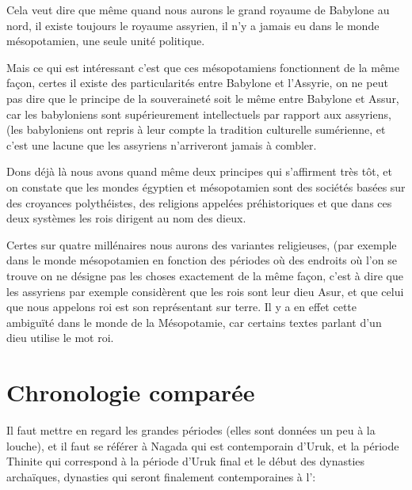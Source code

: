 \documentclass[a4paper,10pt]{article}
\begin{document}
Cela veut dire que même quand nous aurons le grand royaume de Babylone 
au nord, il existe toujours le royaume assyrien, il n'y a jamais eu 
dans le monde mésopotamien, une seule unité politique.

Mais ce qui est intéressant c'est que ces mésopotamiens fonctionnent 
de la même façon, certes il existe des particularités entre Babylone 
et l'Assyrie, on ne peut pas dire que le principe de la souveraineté 
soit le même entre Babylone et Assur, car les babyloniens sont 
supérieurement intellectuels par rapport aux assyriens, (les 
babyloniens ont repris à leur compte la tradition culturelle 
sumérienne, et c'est une lacune que les assyriens n'arriveront jamais 
à combler.

Dons déjà là nous avons quand même deux principes qui s'affirment très 
tôt, et on constate que les mondes égyptien et mésopotamien sont des 
sociétés basées sur des croyances polythéistes, des religions appelées 
préhistoriques et que dans ces deux systèmes les rois dirigent au nom 
des dieux.

Certes sur quatre millénaires nous aurons des variantes religieuses, 
(par exemple dans le monde mésopotamien en fonction des périodes où des 
endroits où l'on se trouve on ne désigne pas les choses exactement de 
la même façon, c'est à dire que les assyriens par exemple considèrent 
que les rois sont leur dieu Asur, et que celui que nous appelons roi 
est son représentant sur terre. 
Il y a en effet cette ambiguïté dans le monde de la Mésopotamie, car
certains textes parlant d'un dieu utilise le mot roi.

\section{Chronologie comparée}

Il faut mettre en regard les grandes périodes (elles sont données un 
peu à la louche), et il faut se référer à Nagada qui est contemporain 
d'Uruk, et la période Thinite qui correspond à la période d'Uruk final 
et le début des dynasties archaïques, dynasties qui seront finalement 
contemporaines à l'\OK :
\end{document}

